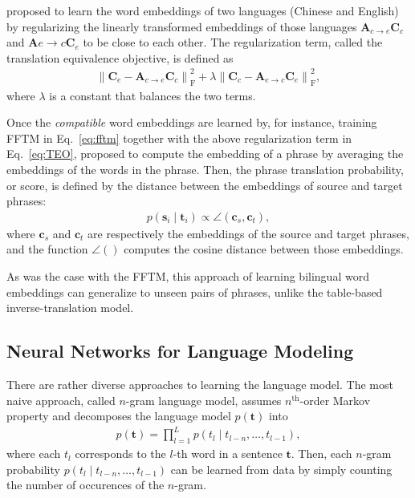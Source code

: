 \documentclass[11pt, oneside]{essay}
\newcommand{\vect}[1]{\mathbf{#1}}
\newcommand{\matr}[1]{\mathbf{#1}}
\newcommand{\vc}[0]{\vect{c}}
\newcommand{\vs}[0]{\vect{s}}
\newcommand{\vt}[0]{\vect{t}}
\newcommand{\mA}{\matr{A}}
\newcommand{\mC}{\matr{C}}
\begin{document}
\citet{Zou2013} proposed to learn the word embeddings of two
languages (Chinese and English) by regularizing the linearly
transformed embeddings of those languages $\mA_{c\to e} \mC_c$
and $\mA{e\to c} \mC_e$ to be close to each other. The
regularization term, called the translation equivalence
objective, is defined as
\begin{align}
\label{eq:TEO}
\left\| \mC_e - \mA_{c \to e} \mC_c \right\|^2_{\text{F}} + 
\lambda \left\| \mC_c - \mA_{e \to c} \mC_e \right\|^2_{\text{F}},
\end{align}
where $\lambda$ is a constant that balances the two terms.

Once the \textit{compatible} word embeddings are learned by, for
instance, training FFTM in Eq.~\eqref{eq:fftm} together with the
above regularization term in Eq.~\eqref{eq:TEO}, \citet{Zou2013}
proposed to compute the embedding of a phrase by averaging the
embeddings of the words in the phrase. Then, the phrase
translation probability, or score, is defined by the distance
between the embeddings of source and target phrases:
\begin{align*}
p(\vs_i \mid \vt_i) \propto \angle\left( \vc_s, \vc_t
        \right),
\end{align*}
where $\vc_s$ and $\vc_t$ are respectively the embeddings of the
source and target phrases, and the function $\angle()$
computes the cosine distance between those embeddings.

As was the case with the FFTM, this approach of learning
bilingual word embeddings can generalize to unseen pairs of
phrases, unlike the table-based inverse-translation model.












\subsection{Neural Networks for Language Modeling}

There are rather diverse approaches to learning the language
model. The most naive approach, called $n$-gram language model,
assumes $n^{\text{th}}$-order Markov property and decomposes the
language model $p(\vt)$ into
\begin{align}
    \label{eq:ngram}
    p(\vt) = \prod_{l=1}^L p(t_l \mid t_{l-n}, \dots, t_{l-1}),
\end{align}
where each $t_l$ corresponds to the $l$-th word in a sentence
$\vt$. Then, each $n$-gram probability $p(t_l \mid t_{l-n},
\dots, t_{l-1})$ can be learned from data by simply counting the
number of occurences of the $n$-gram. 
\end{document}
